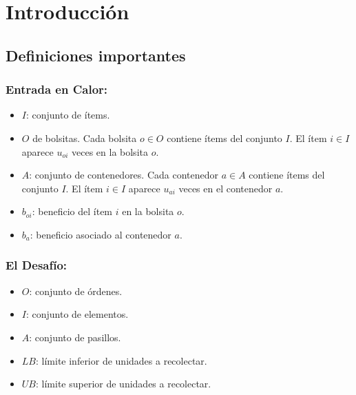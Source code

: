 \documentclass[a4paper,12pt]{article}
\begin{document}
\thispagestyle{empty}
\clearpage

\tableofcontents
\clearpage

\section{Introducción}



\subsection{Definiciones importantes}

\subsubsection*{Entrada en Calor:}

\begin{itemize}
    \item $I$: conjunto de ítems.
    \item $O$ de bolsitas. Cada bolsita $o \in O$ contiene ítems del conjunto $I$. El ítem $i \in I$ aparece $u_{oi}$ veces en la bolsita $o$.
    \item $A$: conjunto de contenedores. Cada contenedor $a \in A$ contiene ítems del conjunto $I$. El ítem $i \in I$ aparece $u_{ai}$ veces en el contenedor $a$.
    \item $b_{oi}$: beneficio del ítem $i$ en la bolsita $o$.
    \item $b_a$: beneficio asociado al contenedor $a$.
    
\end{itemize}

\subsubsection*{El Desafío:}

\begin{itemize}
    \item $O$: conjunto de órdenes.
    \item $I$: conjunto de elementos.
    \item $A$: conjunto de pasillos.
    \item $LB$: límite inferior de unidades a recolectar.
    \item $UB$: límite superior de unidades a recolectar.
\end{itemize}
\end{document}
